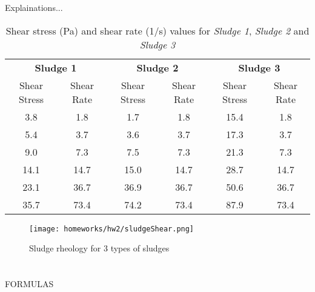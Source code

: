 \documentclass[a4paper]{article}
\begin{document}
\section{}
Explainations... 
\begin{table}[ht]
    \caption{Shear stress (Pa) and shear rate (1/s) values for \textit{Sludge 1}, \textit{Sludge 2} and \textit{Sludge 3}}
    \centering
    \footnotesize
    \begin{tabular}{cccccc}
         \toprule
         \multicolumn{2}{c}{\textbf{Sludge 1}} & \multicolumn{2}{c}{\textbf{Sludge 2}} & \multicolumn{2}{c}{\textbf{Sludge 3}} \\
         \cmidrule(lr){1-2} \cmidrule(lr){3-4} \cmidrule(lr){5-6}
         \multicolumn{1}{c}{Shear Stress} & \multicolumn{1}{c}{Shear Rate} & \multicolumn{1}{c}{Shear Stress} & \multicolumn{1}{c}{Shear Rate} & \multicolumn{1}{c}{Shear Stress} & \multicolumn{1}{c}{Shear Rate} \\
         \cmidrule(lr){1-1} \cmidrule(lr){2-2} \cmidrule(lr){3-3} \cmidrule(lr){4-4} \cmidrule(lr){5-5} \cmidrule(lr){6-6}
         3.8	& 1.8	& 1.7	& 1.8	& 15.4	& 1.8 \\
         5.4	& 3.7	& 3.6	& 3.7	& 17.3	& 3.7 \\
         9.0	& 7.3	& 7.5	& 7.3	& 21.3	& 7.3 \\
         14.1 & 14.7	& 15.0	& 14.7 & 28.7 & 14.7 \\
         23.1 & 36.7 & 36.9 & 36.7 & 50.6 & 36.7 \\
         35.7 & 73.4 & 74.2 & 73.4 & 87.9 & 73.4 \\
         \bottomrule
    \end{tabular}
    \label{tab:rheology}
\end{table}

\begin{figure}[ht]
    \centering
    \texttt{[image: homeworks/hw2/sludgeShear.png]}
    \caption{Sludge rheology for 3 types of sludges}
    \label{fig:SludgeShear}
\end{figure}
\section{}
\cite{sanin2011}
\begin{minipage}[c]{0.6\textwidth}
FORMULAS
\end{minipage}
\hfill
\begin{minipage}{0.3\textwidth}
\end{minipage}
\printbibliography
\end{document}

